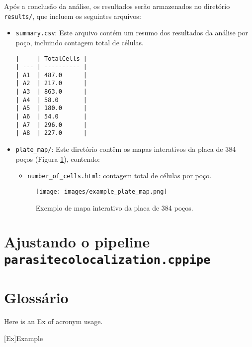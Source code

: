 \documentclass{article}
\begin{document}
Após a conclusão da análise, os resultados serão armazenados no diretório \texttt{results/}, que incluem os seguintes arquivos:

\begin{itemize}
  \item \texttt{summary.csv}: Este arquivo contém um resumo dos resultados da análise por poço, incluindo contagem total de células.

\begin{verbatim}
|     | TotalCells |
| --- | ---------- |
| A1  | 487.0      |
| A2  | 217.0      |
| A3  | 863.0      |
| A4  | 58.0       |
| A5  | 180.0      |
| A6  | 54.0       |
| A7  | 296.0      |
| A8  | 227.0      |
\end{verbatim}
  
  \item \texttt{plate\_map/}: Este diretório contêm os mapas interativos da placa de 384 poços (Figura \ref{fig:plate_map}), contendo:

  \begin{itemize}
    \item \texttt{number\_of\_cells.html}: contagem total de células por poço.
  \end{itemize}

  \begin{figure}[H]
    \centering
    \texttt{[image: images/example\_plate\_map.png]}
    \caption{Exemplo de mapa interativo da placa de 384 poços.}
    \label{fig:plate_map}
  \end{figure}

\end{itemize}

\section{Ajustando o pipeline \texttt{parasitecolocalization.cppipe}}

\section{Glossário}

Here is an \ac{Ex} of acronym usage.

\begin{acronym} \itemsep=-8pt
  [Ex]{Example}
\end{acronym}

\printbibliography
\end{document}
